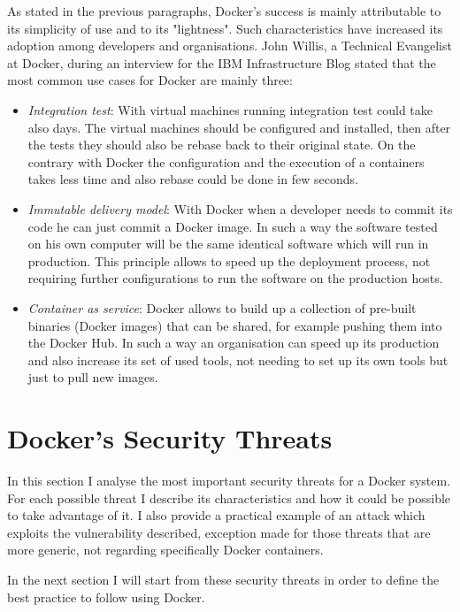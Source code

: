 \documentclass[a4paper,12pt]{article}
\begin{document}
As stated in the previous paragraphs, Docker's success is mainly attributable to
its simplicity of use and to its "lightness". Such characteristics have
increased its adoption among developers and organisations. John Willis, a
Technical Evangelist at Docker, during an interview for the IBM Infrastructure
Blog stated\cite{ibm_interview_john_willis} that the most common use cases for
Docker are mainly three:
\begin{itemize}
  \item \textit{Integration test}: With virtual machines running integration
  test could take also days. The virtual machines should be configured and
  installed, then after the tests they should also be rebase back to their
  original state. On the contrary with Docker the configuration and the
  execution of a containers takes less time and also rebase could be done in few
  seconds.
  \item \textit{Immutable delivery model}: With Docker when a developer needs to
  commit its code he can just commit a Docker image. In such a way the software
  tested on his own computer will be the same identical software which will run
  in production. This principle allows to speed up the deployment process, not
  requiring further configurations to run the software on the production hosts.
  \item \textit{Container as service}: Docker allows to build up a collection of
  pre-built binaries (Docker images) that can be shared, for example pushing
  them into the Docker Hub. In such a way an organisation can speed up its
  production and also increase its set of used tools, not needing to set up its
  own tools but just to pull new images.
  
\end{itemize}


\newpage

\section{Docker's Security Threats}
 
In this section I analyse the most important security threats for a Docker
system. For each possible threat I describe its characteristics and how it could
be possible to take advantage of it. I also provide a practical example of an
attack which exploits the vulnerability described, exception made for those
threats that are more generic, not regarding specifically Docker containers.
\par In the next section I will start from these security threats in order to
define the best practice to follow using Docker.
\end{document}
